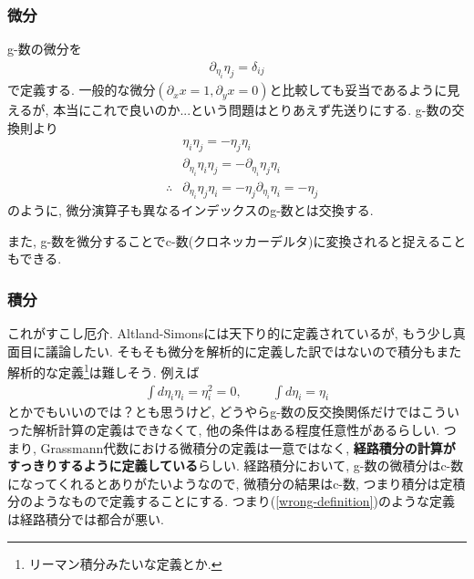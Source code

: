 \documentclass[10.5pt,a4paper]{jreport}
\begin{document}
\subsubsection{微分}
g-数の微分を
\begin{eqnarray}
  \partial_{\eta_i}\eta_j = \delta_{ij}
\end{eqnarray}
で定義する. 一般的な微分$(\partial_x x = 1, \partial_y x = 0)$と比較しても妥当であるように見えるが, 本当にこれで良いのか...という問題はとりあえず先送りにする. g-数の交換則より
\begin{eqnarray}
  &&\eta_i\eta_j = -\eta_j\eta_i\\
  &&\partial_{\eta_i}\eta_i\eta_j = -\partial_{\eta_i}\eta_j\eta_i\\
  &\therefore&\partial_{\eta_i}\eta_j\eta_i = -\eta_j\partial_{\eta_i}\eta_i= -\eta_j
\end{eqnarray}
のように, 微分演算子も異なるインデックスのg-数とは交換する.

また, g-数を微分することでc-数(クロネッカーデルタ)に変換されると捉えることもできる.
\subsubsection{積分}
これがすこし厄介. Altland-Simonsには天下り的に定義されているが, もう少し真面目に議論したい. そもそも微分を解析的に定義した訳ではないので積分もまた解析的な定義\footnote{リーマン積分みたいな定義とか.}は難しそう. 例えば
\begin{eqnarray}
  \int d\eta_i \eta_i = \eta_i^2 = 0, \hspace{1cm}\int d\eta_i = \eta_i\label{wrong-definition}
\end{eqnarray}
とかでもいいのでは？とも思うけど, どうやらg-数の反交換関係だけではこういった解析計算の定義はできなくて, 他の条件はある程度任意性があるらしい. つまり, Grassmann代数における微積分の定義は一意ではなく, \textbf{経路積分の計算がすっきりするように定義している}らしい. 経路積分において, g-数の微積分はc-数になってくれるとありがたいようなので, 微積分の結果はc-数, つまり積分は定積分のようなもので定義することにする. つまり(\ref{wrong-definition})のような定義は経路積分では都合が悪い. 
\end{document}
